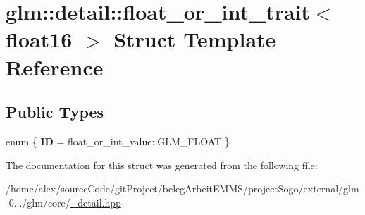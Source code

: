 \hypertarget{structglm_1_1detail_1_1float__or__int__trait_3_01float16_01_4}{\section{glm\-:\-:detail\-:\-:float\-\_\-or\-\_\-int\-\_\-trait$<$ float16 $>$ Struct Template Reference}
\label{structglm_1_1detail_1_1float__or__int__trait_3_01float16_01_4}
}
\subsection*{Public Types}
\begin{DoxyCompactItemize}
\item 
enum \{ {\bfseries I\-D} = float\-\_\-or\-\_\-int\-\_\-value\-:\-:G\-L\-M\-\_\-\-F\-L\-O\-A\-T
 \}
\end{DoxyCompactItemize}


The documentation for this struct was generated from the following file\-:\begin{DoxyCompactItemize}
\item 
/home/alex/source\-Code/git\-Project/beleg\-Arbeit\-E\-M\-M\-S/project\-Sogo/external/glm-\/0.../glm/core/\hyperlink{__detail_8hpp}{\-\_\-detail.\-hpp}\end{DoxyCompactItemize}

